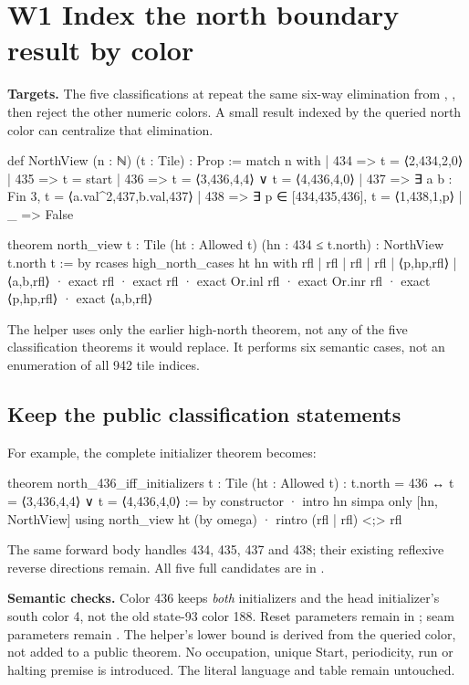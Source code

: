 \section{W1 Index the north boundary result by color}
\label{sec:north}

\textbf{Targets.} The five classifications at
 repeat the same six-way elimination
from , , then
reject the other numeric colors. A small result indexed by the queried
north color can centralize that elimination.

\begin{Lean}
def NorthView (n : ℕ) (t : Tile) : Prop :=
  match n with
  | 434 => t = ⟨2,434,2,0⟩
  | 435 => t = start
  | 436 => t = ⟨3,436,4,4⟩ ∨ t = ⟨4,436,4,0⟩
  | 437 => ∃ a b : Fin 3, t = ⟨a.val^2,437,b.val,437⟩
  | 438 => ∃ p ∈ [434,435,436], t = ⟨1,438,1,p⟩
  | _ => False

theorem north_view {t : Tile} (ht : Allowed t)
    (hn : 434 ≤ t.north) : NorthView t.north t := by
  rcases high_north_cases ht hn with
    rfl | rfl | rfl | rfl | ⟨p,hp,rfl⟩ | ⟨a,b,rfl⟩
  · exact rfl
  · exact rfl
  · exact Or.inl rfl
  · exact Or.inr rfl
  · exact ⟨p,hp,rfl⟩
  · exact ⟨a,b,rfl⟩
\end{Lean}

The helper uses only the earlier high-north theorem, not any of the five
classification theorems it would replace. It performs six semantic cases,
not an enumeration of all 942 tile indices.

\subsection{Keep the public classification statements}

For example, the complete initializer theorem becomes:
\begin{Lean}
theorem north_436_iff_initializers {t : Tile} (ht : Allowed t) :
    t.north = 436 ↔ t = ⟨3,436,4,4⟩ ∨ t = ⟨4,436,4,0⟩ := by
  constructor
  · intro hn
    simpa only [hn, NorthView] using north_view ht (by omega)
  · rintro (rfl | rfl) <;> rfl
\end{Lean}

The same forward body handles 434, 435, 437 and 438; their existing reflexive
reverse directions remain. All five full candidates are in
.

\textbf{Semantic checks.} Color 436 keeps \emph{both} initializers and the
head initializer's south color 4, not the old state-93 color 188. Reset
parameters remain in \code{[434,435,436]}; seam parameters remain
. The helper's lower bound is derived from the queried color,
not added to a public theorem. No occupation, unique Start, periodicity,
run or halting premise is introduced. The literal  language
and table remain untouched.


